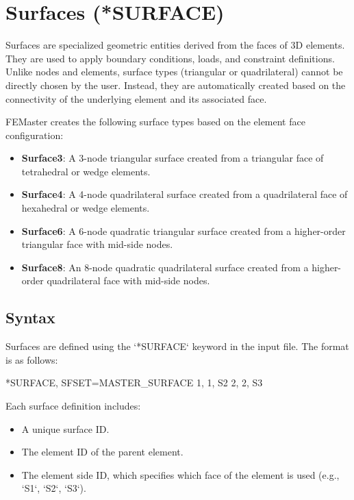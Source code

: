 \newpage


\section{Surfaces (*SURFACE)}
Surfaces are specialized geometric entities derived from the faces of 3D elements. They are used to apply boundary conditions, loads, and constraint definitions. Unlike nodes and elements, surface types (triangular or quadrilateral) cannot be directly chosen by the user. Instead, they are automatically created based on the connectivity of the underlying element and its associated face.

FEMaster creates the following surface types based on the element face configuration:

\begin{itemize}
    \item \textbf{Surface3}: A 3-node triangular surface created from a triangular face of tetrahedral or wedge elements.
    \item \textbf{Surface4}: A 4-node quadrilateral surface created from a quadrilateral face of hexahedral or wedge elements.
    \item \textbf{Surface6}: A 6-node quadratic triangular surface created from a higher-order triangular face with mid-side nodes.
    \item \textbf{Surface8}: An 8-node quadratic quadrilateral surface created from a higher-order quadrilateral face with mid-side nodes.
\end{itemize}


\subsection{Syntax}
Surfaces are defined using the `*SURFACE` keyword in the input file. The format is as follows:

\begin{codeBlock}
*SURFACE, SFSET=MASTER_SURFACE
1, 1, S2
2, 2, S3
\end{codeBlock}

Each surface definition includes:

\begin{itemize}
    \item A unique surface ID.
    \item The element ID of the parent element.
    \item The element side ID, which specifies which face of the element is used (e.g., `S1`, `S2`, `S3`).
\end{itemize}


